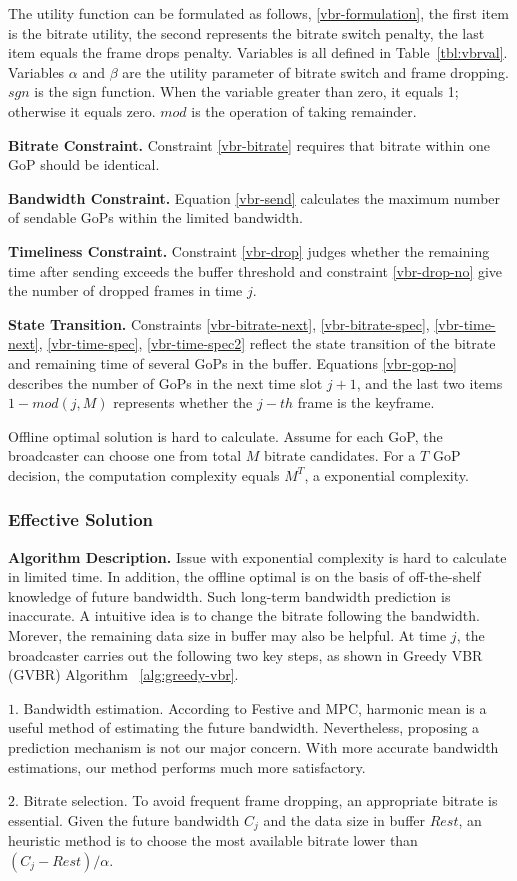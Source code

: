 The utility function can be formulated as follows, \ref{vbr-formulation}, the first item is the bitrate utility, the second represents the bitrate switch penalty, the last item equals the frame drops penalty. Variables is all defined in Table~\ref{tbl:vbrval}. Variables $\alpha$ and $\beta$ are the utility parameter of bitrate switch and frame dropping. $sgn$ is the sign function. When the variable greater than zero, it equals 1; otherwise it equals zero. $mod$ is the operation of taking remainder.

\textbf{Bitrate Constraint.} Constraint \ref{vbr-bitrate} requires that bitrate within one GoP should be identical.

\textbf{Bandwidth Constraint.} Equation \ref{vbr-send} calculates the maximum number of sendable GoPs within the limited bandwidth.

\textbf{Timeliness Constraint.} Constraint \ref{vbr-drop} judges whether the remaining time after sending exceeds the buffer threshold and constraint \ref{vbr-drop-no} give the number of dropped frames in time $j$.

\textbf{State Transition.} Constraints \ref{vbr-bitrate-next}, \ref{vbr-bitrate-spec}, \ref{vbr-time-next}, \ref{vbr-time-spec}, \ref{vbr-time-spec2} reflect the state transition of the bitrate and remaining time of several GoPs in the buffer. Equations \ref{vbr-gop-no} describes the number of GoPs in the next time slot $j+1$, and the last two items $1-mod(j,M)$ represents whether the $j-th$ frame is the keyframe.

Offline optimal solution is hard to calculate. Assume for each GoP, the broadcaster can choose one from total $M$ bitrate candidates. For a $T$ GoP decision, the computation complexity equals $M^T$, a exponential complexity.

\subsubsection{Effective Solution}

\textbf{Algorithm Description.} Issue with exponential complexity is hard to calculate in limited time. In addition, the offline optimal is on the basis of off-the-shelf knowledge of future bandwidth. Such long-term bandwidth prediction is inaccurate. A intuitive idea is to change the bitrate following the bandwidth. Morever, the remaining data size in buffer may also be helpful. At time $j$, the broadcaster carries out the following two key steps, as shown in Greedy VBR (GVBR) Algorithm ~\ref{alg:greedy-vbr}.

$1.$ Bandwidth estimation. According to Festive and MPC, harmonic mean is a useful method of estimating the future bandwidth. Nevertheless, proposing a prediction mechanism is not our major concern. With more accurate bandwidth estimations, our method performs much more satisfactory.

$2.$ Bitrate selection. To avoid frequent frame dropping, an appropriate bitrate is essential. Given the future bandwidth $C_j$ and the data size in buffer $Rest$, an heuristic method is to choose the most available bitrate lower than $(C_j-Rest)/\alpha$.
